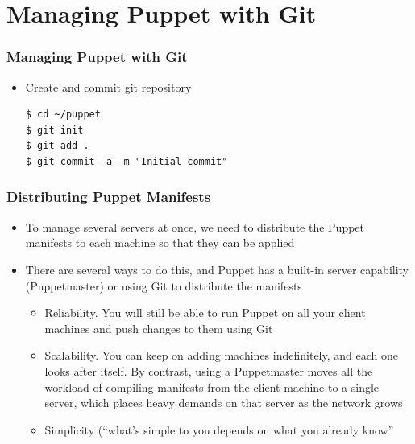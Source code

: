 \documentclass{beamer}
\begin{document}
\section{Managing Puppet with Git}
\begin{frame}[fragile]
\frametitle{Managing Puppet with  Git}
\begin{itemize}
\item Create and commit git repository
\lstset{language=shell}
\begin{lstlisting}[escapechar=&]
$ cd ~/puppet
$ git init
$ git add .
$ git commit -a -m "Initial commit"
\end{lstlisting}

\end{itemize}

\end{frame}
\begin{frame}[fragile]
\frametitle{Distributing Puppet Manifests}
\begin{itemize}
\item To manage several servers at once, we need to distribute
the Puppet manifests to each machine so that they can be applied
\item There are several ways to do this, and Puppet has a built-in server capability (Puppetmaster) or using Git to distribute the manifests
\begin{itemize}
\item Reliability. You will still be able to run
Puppet on all your client machines and push changes to them using Git
\item Scalability. You can keep on adding machines indefinitely, and each one looks after itself. By contrast, using
a Puppetmaster moves all the workload of compiling manifests from the client machine to a
single server, which places heavy demands on that server as the network grows
\item Simplicity (``what's simple to you depends on what you already know''
\end{itemize}

\end{itemize}

\end{frame}
\end{document}
